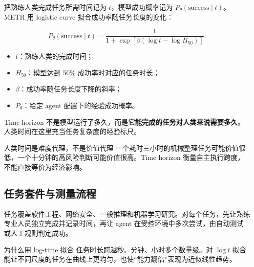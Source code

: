 \documentclass[a4paper]{article}
\begin{document}

把熟练人类完成任务所需时间记为 $t$，模型成功概率记为 $P_\theta(\text{success}\mid t)$。METR 用 logistic curve 拟合成功率随任务长度的变化：

$$
P_\theta(\text{success}\mid t)=
\frac{1}{1+\exp\left[\beta\left(\log t-\log H_{50}\right)\right]}.
$$

\begin{itemize}
    \item $t$：熟练人类的完成时间；
    \item $H_{50}$：模型达到 50\% 成功率时对应的任务时长；
    \item $\beta$：成功率随任务长度下降的斜率；
    \item $P_\theta$：给定 agent 配置下的经验成功概率。
\end{itemize}

Time horizon 不是模型运行了多久，而是\textbf{它能完成的任务对人类来说需要多久}。人类时间在这里充当任务复杂度的经验标尺。

\begin{importantbox}{人类时间是难度代理，不是价值代理}
一个耗时三小时的机械整理任务可能价值很低，一个十分钟的高风险判断可能价值很高。Time horizon 衡量自主执行跨度，不能直接等价为经济影响。
\end{importantbox}

\subsection{任务套件与测量流程}



任务覆盖软件工程、网络安全、一般推理和机器学习研究。对每个任务，先让熟练专业人员独立完成并记录时间，再让 agent 在受控环境中多次尝试，由自动测试或人工规则判定成功。

\begin{knowledgebox}{为什么用 log-time 拟合}
任务时长跨越秒、分钟、小时多个数量级。对 $\log t$ 拟合能让不同尺度的任务在曲线上更均匀，也使“能力翻倍”表现为近似线性趋势。
\end{knowledgebox}
\end{document}
